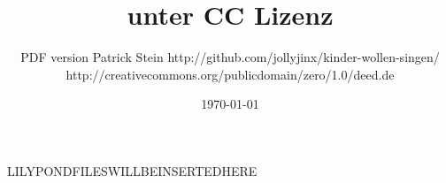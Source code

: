 \documentclass[10pt]{article}
\title{ unter CC Lizenz}
\author{ PDF version Patrick Stein http://github.com/jollyjinx/kinder-wollen-singen/  \\ http://creativecommons.org/publicdomain/zero/1.0/deed.de }
\date{\today}
\begin{document}
\maketitle

\begin{adjustwidth}{1.5cm}{1.5cm}
\tableofcontents
\end{adjustwidth}

\pagebreak

LILYPONDFILESWILLBEINSERTEDHERE
\end{document}
